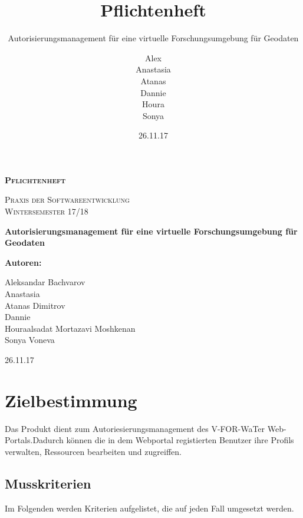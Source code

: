 \documentclass[parskip=full,11pt]{scrartcl}
\title{Pflichtenheft}
\subtitle{Autorisierungsmanagement für eine virtuelle Forschungsumgebung für Geodaten}
\author{Alex\\Anastasia\\Atanas\\Dannie\\ Houra\\Sonya\\}
\date{26.11.17}
\begin{document}
\begin{titlepage}
	
	\begin{center}
	{\scshape\LARGE\bfseries Pflichtenheft \par}
	\vspace{1cm}
	{\scshape\Large Praxis der Softwareentwicklung\\}
	\vspace{1cm}
	{\scshape\Large Wintersemester 17/18\\}
	\vspace{3cm}
	{\huge\bfseries Autorisierungsmanagement für eine virtuelle Forschungsumgebung für Geodaten\par}
	\vspace{2cm}
	\vfill
	{\bfseries {\Large Autoren}:\par}
	{\Large Aleksandar Bachvarov}\\
	{\Large Anastasia}\\%
	{\Large Atanas Dimitrov}\\
	{\Large Dannie}\\%
	{\Large Houraalsadat Mortazavi Moshkenan}\\
	{\Large Sonya Voneva}\\
	\vfill
	{\large 26.11.17 \par}
	\end{center}
\end{titlepage}
\tableofcontents

\newpage
\section{Zielbestimmung}
Das Produkt dient  zum Autoriesierungsmanagement des  \gls{V-FOR-WaTer} Web-Portals.Dadurch können die in dem Webportal registierten \gls{Benutzer} ihre Profils verwalten, Ressourcen bearbeiten und zugreiffen.

\subsection{Musskriterien}
Im Folgenden werden Kriterien aufgelistet, die auf jeden Fall umgesetzt werden.
\end{document}

